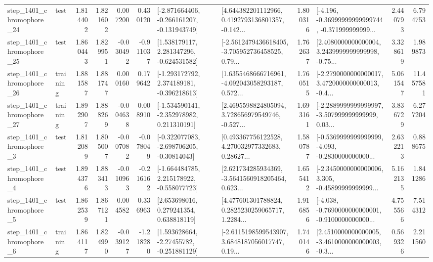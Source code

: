 \begin{tabular}{llrrrrllrlrr}
 step\_1401\_chromophore\_24 &      test &      1.814402 &    1.821602 &      0.007200 &  0.430120 &  [-2.871664406, -0.266161207, -0.131943749] &  [4.644382201112966, 0.4192793136801357, -0.142... &       1.800316 &  [-4.196, -0.36999999999999744, -0.371999999999... &            2.440793 &          6.794753 \\
 step\_1401\_chromophore\_25 &      test &      1.860443 &    1.829951 &     -0.030492 & -0.911037 &    [1.538179117, 2.281347296, -0.624531582] &  [-2.5612479436618405, -3.705952736458525, 0.79... &       1.762637 &  [2.4080000000000004, 3.2439999999999998, -0.75... &            3.328619 &          1.989873 \\
 step\_1401\_chromophore\_26 &  training &      1.881587 &    1.881747 &      0.000160 &  0.179642 &   [-1.293172792, 2.374189181, -0.396218613] &  [1.6355468666716961, -4.092043058293187, 0.572... &       1.760515 &  [-2.2790000000000017, 3.4720000000000013, -0.4... &            5.061547 &         11.457581 \\
 step\_1401\_chromophore\_27 &  training &      1.892907 &    1.888269 &     -0.004638 &  0.008910 &   [-1.534590141, -2.352978982, 0.211310191] &  [2.4695598824805094, 3.728656979549746, -0.527... &       1.693161 &  [-2.2889999999999997, -3.507999999999999, 0.03... &            3.836729 &          6.277204 \\
  step\_1401\_chromophore\_3 &      test &      1.812089 &    1.805007 &     -0.007082 & -0.078049 &   [-0.322077083, -2.698706205, -0.30814043] &  [0.493367756122528, 4.270032977332683, 0.28627... &       1.580787 &  [-0.5369999999999999, -4.093, -0.2830000000000... &            2.632213 &          0.888675 \\
  step\_1401\_chromophore\_4 &      test &      1.894376 &    1.883413 &     -0.010963 & -0.216162 &   [-1.664484785, 2.215178922, -0.558077723] &  [2.621734285934369, -3.5641560918205464, 0.623... &       1.655412 &  [-2.3450000000000006, 3.305, -0.45899999999999... &            5.162135 &          1.841286 \\
  step\_1401\_chromophore\_5 &      test &      1.862539 &    1.867121 &      0.004582 &  0.336963 &     [2.653698016, 0.279241354, 0.638818119] &  [4.477601301788824, 0.2825230259065717, 1.2284... &       1.916856 &  [-4.038, -0.7690000000000001, -0.9100000000000... &            4.755566 &          7.514312 \\
  step\_1401\_chromophore\_6 &  training &      1.864117 &    1.824990 &     -0.039127 & -1.218280 &    [1.593628664, -2.27455782, -0.251881129] &  [-2.6115198599543907, 3.6848187056017747, 0.19... &       1.740146 &  [2.4510000000000005, -3.4610000000000003, -0.3... &            0.569326 &          2.211560 \\

\end{tabular}
